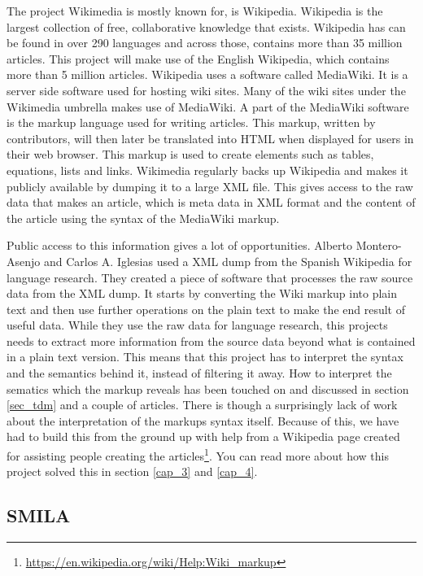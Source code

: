 The project Wikimedia is mostly known for, is Wikipedia\cite{wikipedia}. Wikipedia is the largest collection of free, collaborative knowledge that exists. Wikipedia has can be found in over 290 languages and across those, contains more than 35 million articles. This project will make use of the English Wikipedia, which contains more than 5 million articles. Wikipedia uses a  software called MediaWiki\cite{mediawiki}. It is a server side software used for hosting wiki sites. Many of the wiki sites under the Wikimedia umbrella makes use of MediaWiki. A part of the MediaWiki software is the markup language used for writing articles. This markup, written by contributors, will then later be translated into HTML when displayed for users in their web browser. This markup is used to create elements such as tables, equations, lists and links. Wikimedia regularly backs up Wikipedia and makes it publicly available by dumping it to a large XML file. This gives access to the raw data that makes an article, which is meta data in XML format and the content of the article using the syntax of the MediaWiki markup. 

Public access to this information gives a lot of opportunities. Alberto Montero-Asenjo and Carlos A. Iglesias used a XML dump from the Spanish Wikipedia for language research\cite{lr-wiki}. They created a piece of software that processes the raw source data from the XML dump. It starts by converting the Wiki markup into plain text and then use further operations on the plain text to make the end result of useful data. While they use the raw data for language research, this projects needs to extract more information from the source data beyond what is contained in a plain text version. This means that this project has to interpret the syntax and the semantics behind it, instead of filtering it away.
How to interpret the sematics which the markup reveals has been touched on and discussed in section \ref{sec_tdm} and a couple of articles\cite{text-cat}\cite{wlm}. There is though a surprisingly lack of work about the interpretation of the markups syntax itself. Because of this, we have had to build this from the ground up with help from a Wikipedia page created for assisting people creating the articles\footnote{\url{https://en.wikipedia.org/wiki/Help:Wiki_markup}}. You can read more about how this project solved this in section \ref{cap_3} and \ref{cap_4}.



\subsection{SMILA} \label{smila}

